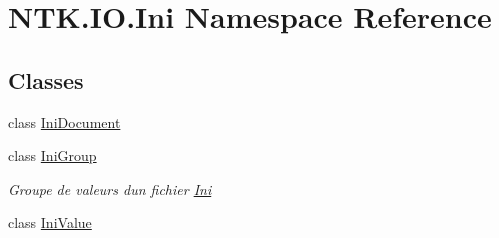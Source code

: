 \hypertarget{namespace_n_t_k_1_1_i_o_1_1_ini}{}\section{N\+T\+K.\+I\+O.\+Ini Namespace Reference}
\label{namespace_n_t_k_1_1_i_o_1_1_ini}
\subsection*{Classes}
\begin{DoxyCompactItemize}
\item 
class \mbox{\hyperlink{class_n_t_k_1_1_i_o_1_1_ini_1_1_ini_document}{Ini\+Document}}
\item 
class \mbox{\hyperlink{class_n_t_k_1_1_i_o_1_1_ini_1_1_ini_group}{Ini\+Group}}
\begin{DoxyCompactList}\small\item\em Groupe de valeurs d\textquotesingle{}un fichier \mbox{\hyperlink{namespace_n_t_k_1_1_i_o_1_1_ini}{Ini}} \end{DoxyCompactList}\item 
class \mbox{\hyperlink{class_n_t_k_1_1_i_o_1_1_ini_1_1_ini_value}{Ini\+Value}}
\end{DoxyCompactItemize}
